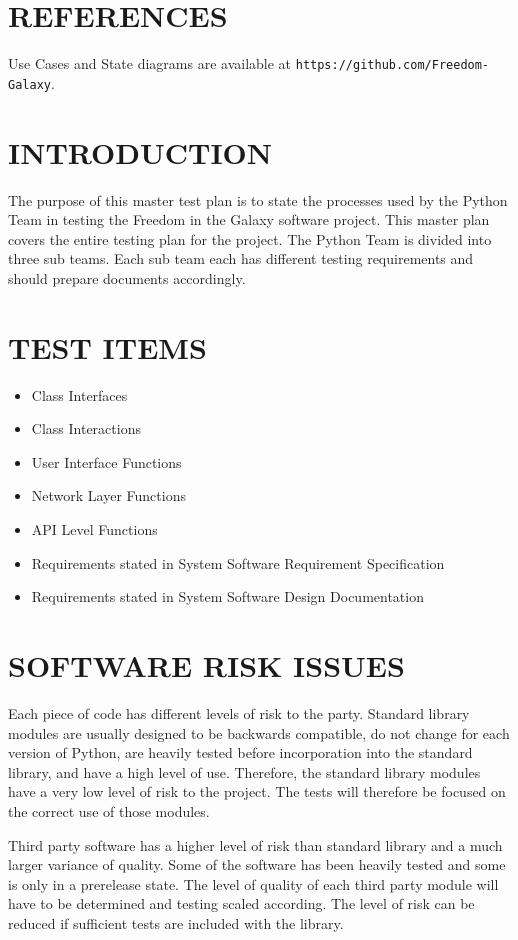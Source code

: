 \documentclass[report]{article}
\begin{document}
\section[REFERENCES]{REFERENCES}
Use Cases and State diagrams are available at {\tt https://github.com/Freedom-Galaxy}.


\section[INTRODUCTION]{INTRODUCTION}
The purpose of this master test plan is to state the processes used by the Python Team in testing the Freedom in the Galaxy software project. This master plan covers the entire testing plan for the project. The Python Team is divided into three sub teams. Each sub team each has different testing requirements and should prepare documents accordingly.

\section[TEST ITEMS]{TEST ITEMS}
\begin{itemize}
\item Class Interfaces
\item Class Interactions
\item User Interface Functions
\item Network Layer Functions
\item API Level Functions
\item Requirements stated in System Software Requirement Specification
\item Requirements stated in System Software Design Documentation
\end{itemize}

\section[SOFTWARE RISK ISSUES]{SOFTWARE RISK ISSUES}
\label{risk}
Each piece of code has different levels of risk to the party. Standard library modules are usually designed to be backwards compatible, do not change for each version of Python, are heavily tested before incorporation into the standard library, and have a high level of use. Therefore, the standard library modules have a very low level of risk to the project. The tests will therefore be focused on the correct use of those modules.

Third party software has a higher level of risk than standard library and a much larger variance of quality. Some of the software has been heavily tested and some is only in a prerelease state. The level of quality of each third party module will have to be determined and testing scaled according. The level of risk can be reduced if sufficient tests are included with the library.
\end{document}

